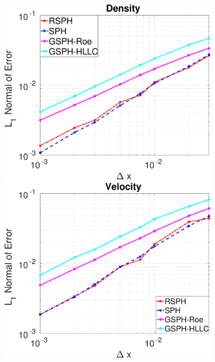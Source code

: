 \begin{figure}
    \centering
    \begin{minipage}{.332\textwidth}
        \centering
        \includegraphics[width=0.99 \textwidth]{Chapter-4/Figures/Accuracy-des}
    \end{minipage}%
    \begin{minipage}{.332 \textwidth}
        \centering
        \includegraphics[width=0.99 \textwidth]{Chapter-4/Figures/Accuracy-vel}

\end{minipage}
\end{figure}
